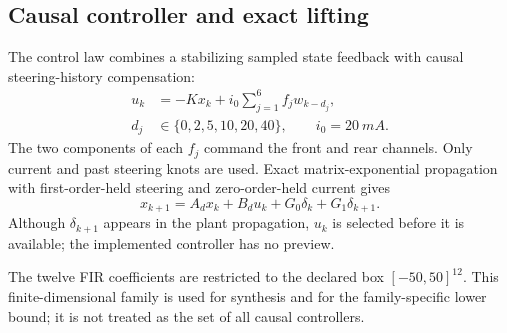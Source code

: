 \documentclass[fleqn,final,5p,times]{elsarticle}
\begin{document}
\subsection{Causal controller and exact lifting}

The control law combines a stabilizing sampled state feedback with causal steering-history compensation:
\begin{equation}
\begin{aligned}
u_k&=-Kx_k+i_0\sum_{j=1}^{6}f_jw_{k-d_j},\\
d_j&\in\{0,2,5,10,20,40\},\qquad i_0=\SI{20}{mA}.
\end{aligned}
\label{eq:policy}
\end{equation}
The two components of each $f_j$ command the front and rear channels. Only current and past steering knots are used. Exact matrix-exponential propagation with first-order-held steering and zero-order-held current gives
\begin{equation}
x_{k+1}=A_dx_k+B_du_k+G_0\delta_k+G_1\delta_{k+1}.
\label{eq:lift}
\end{equation}
Although $\delta_{k+1}$ appears in the plant propagation, $u_k$ is selected before it is available; the implemented controller has no preview.

The twelve FIR coefficients are restricted to the declared box $[-50,50]^{12}$. This finite-dimensional family is used for synthesis and for the family-specific lower bound; it is not treated as the set of all causal controllers.
\end{document}
